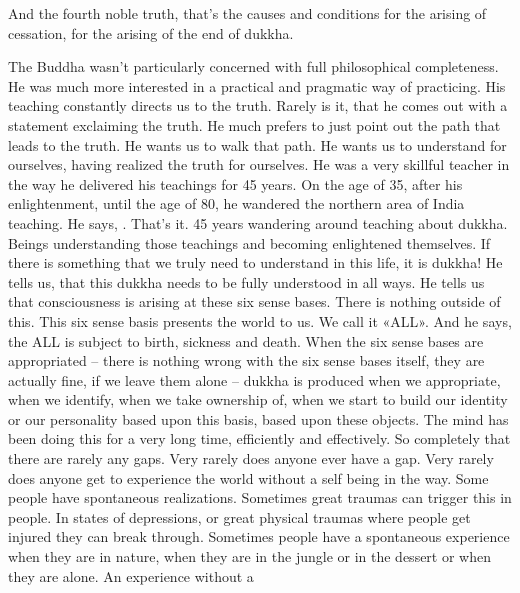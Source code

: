 \documentclass[letterpaper,10pt,english]{sphinxmanual}
\begin{document}
\sphinxAtStartPar
And the fourth noble truth, that’s the causes and conditions for the arising of cessation, for the arising of the end of dukkha.

\sphinxAtStartPar
The  Buddha  wasn’t  particularly  concerned  with  full  philosophical
completeness.  He  was  much  more  interested  in  a  practical  and  pragmatic
way of practicing. His teaching constantly directs us to the truth. Rarely is it,
that he comes out with a statement exclaiming the truth. He much prefers to
just point out the path that leads to the truth. He wants us to walk that path.
He wants us to understand for ourselves, having realized the truth for ourselves. He was a very skillful teacher in the way he delivered his teachings
for 45 years. On the age of 35, after his enlightenment, until the age of 80,
he wandered the northern area of India teaching. He says,
. That’s it. 45 years wandering around
teaching about dukkha. Beings understanding those teachings and becoming
enlightened themselves. If there is something that we truly need to understand in this life, it is dukkha! He tells us, that this dukkha needs to be fully
understood in all ways. He tells us that consciousness is arising at these six
sense bases.
There
is nothing outside of this. This six sense basis presents the world to us. We
call it «ALL».
And he says, the ALL is subject to
birth, sickness and death. When the six sense bases are appropriated – there
is  nothing  wrong  with  the  six  sense  bases  itself,  they  are  actually  fine,  if
we leave them alone – dukkha is produced when we appropriate, when we
identify, when we take ownership of, when we start to build our identity or
our personality based upon this basis, based upon these objects. The mind
has been doing this for a very long time, efficiently and effectively. So completely that there are rarely any gaps. Very rarely does anyone ever have a
  gap. Very rarely does anyone get to experience the world without a self being
in  the  way.  Some  people  have  spontaneous  realizations.  Sometimes  great
traumas can trigger this in people. In states of depressions, or great physical
traumas where people get injured they can break through. Sometimes people
have  a  spontaneous  experience  when  they  are  in  nature,  when  they  are  in
the jungle or in the dessert or when they are alone. An experience without a
\end{document}
